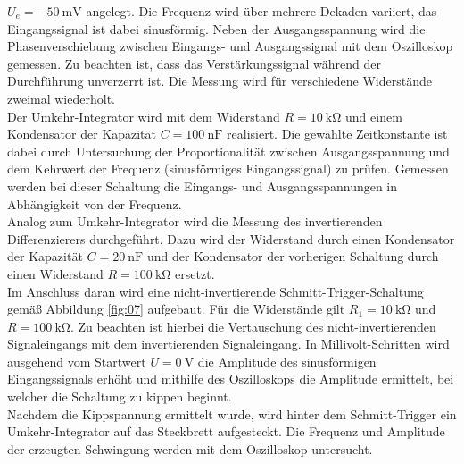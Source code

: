 $U_e = -\SI{50}{\milli\volt}$ angelegt. Die Frequenz wird über mehrere Dekaden
variiert, das Eingangssignal ist dabei sinusförmig. Neben der Ausgangsspannung
wird die Phasenverschiebung zwischen Eingangs- und Ausgangssignal mit dem
Oszilloskop gemessen. Zu beachten ist, dass das Verstärkungssignal während der
Durchführung unverzerrt ist. Die Messung wird für verschiedene Widerstände
zweimal wiederholt. \\
\noindent Der Umkehr-Integrator wird mit dem Widerstand $R = \SI{10}{\kilo\ohm}$
und einem Kondensator der Kapazität $C = \SI{100}{\nano\farad}$ realisiert.
Die gewählte Zeitkonstante ist dabei durch Untersuchung der Proportionalität
zwischen Ausgangsspannung und dem Kehrwert der Frequenz (sinusförmiges
Eingangssignal) zu prüfen. Gemessen werden bei dieser Schaltung die Eingangs-
und Ausgangsspannungen in Abhängigkeit von der Frequenz. \\
\noindent Analog zum Umkehr-Integrator wird die Messung des invertierenden
Differenzierers durchgeführt. Dazu wird der Widerstand durch einen Kondensator
der Kapazität $C = \SI{20}{\nano\farad}$ und der Kondensator der vorherigen
Schaltung durch einen Widerstand $R = \SI{100}{\kilo\ohm}$ ersetzt. \\
\noindent Im Anschluss daran wird eine nicht-invertierende
Schmitt-Trigger-Schaltung gemäß Abbildung \ref{fig:07} aufgebaut. Für die
Widerstände gilt $R_1 = \SI{10}{\kilo\ohm}$ und $R = \SI{100}{\kilo\ohm}$.
Zu beachten ist hierbei die Vertauschung des nicht-invertierenden Signaleingangs
mit dem invertierenden Signaleingang. In Millivolt-Schritten wird ausgehend vom
Startwert $U = \SI{0}{\volt}$ die Amplitude des sinusförmigen Eingangssignals
erhöht und mithilfe des Oszilloskops die Amplitude ermittelt, bei welcher
die Schaltung zu kippen beginnt. \\
\noindent Nachdem die Kippspannung ermittelt wurde, wird hinter dem
Schmitt-Trigger ein Umkehr-Integrator auf das Steckbrett aufgesteckt. Die
Frequenz und Amplitude der erzeugten Schwingung werden mit dem Oszilloskop
untersucht.
